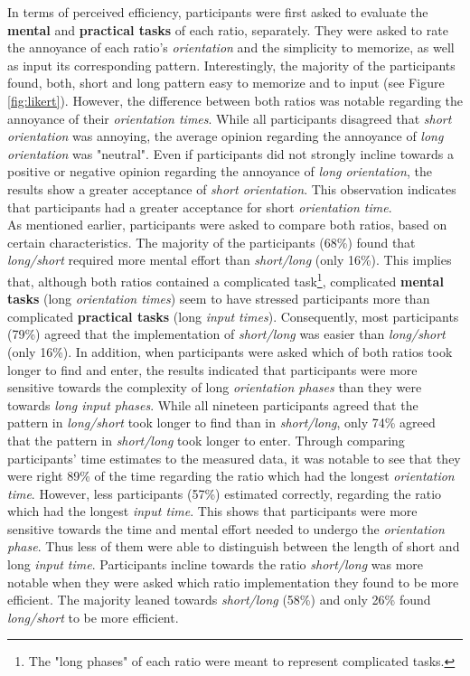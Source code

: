 In terms of perceived efficiency, participants were first asked to evaluate the \textbf{mental} and \textbf{practical tasks} of each ratio, separately. They were asked to rate the annoyance of each ratio's \textit{orientation} and the simplicity to memorize, as well as input its corresponding pattern. Interestingly, the majority of the participants found, both, short and long pattern easy to memorize and to input (see Figure \ref{fig:likert}). However, the difference between both ratios was notable regarding the annoyance of their \textit{orientation times}. While all participants disagreed that \textit{short orientation} was annoying, the average opinion regarding the annoyance of \textit{long orientation} was "neutral". Even if participants did not strongly incline towards a positive or negative opinion regarding the annoyance of \textit{long orientation}, the results show a greater acceptance of \textit{short orientation}. This observation indicates that participants had a greater acceptance for short \textit{orientation time}.\\

As mentioned earlier, participants were asked to compare both ratios, based on certain characteristics. The majority of the participants (68\%) found that \textit{long/short} required more mental effort than \textit{short/long} (only 16\%). This implies that, although both ratios contained a complicated task\footnote{The "long phases" of each ratio were meant to represent complicated tasks.}, complicated \textbf{mental tasks} (long \textit{orientation times}) seem to have stressed participants more than complicated \textbf{practical tasks} (long \textit{input times}). Consequently, most participants (79\%) agreed that the implementation of \textit{short/long} was easier than \textit{long/short} (only 16\%). In addition, when participants were asked which of both ratios took longer to find and enter, the results indicated that participants were more sensitive towards the complexity of long \textit{orientation phases} than they were towards \textit{long input phases}. While all nineteen participants agreed that the pattern in \textit{long/short} took longer to find than in \textit{short/long}, only 74\% agreed that the pattern in \textit{short/long} took longer to enter. Through comparing participants' time estimates to the measured data, it was notable to see that they were right 89\% of the time regarding the ratio which had the longest \textit{orientation time}. However, less participants (57\%) estimated correctly, regarding the ratio which had the longest \textit{input time}. This shows that participants were more sensitive towards the time and mental effort needed to undergo the \textit{orientation phase}. Thus less of them were able to distinguish between the length of short and long \textit{input time}. Participants incline towards the ratio \textit{short/long} was more notable when they were asked which ratio implementation they found to be more efficient. The majority leaned towards \textit{short/long} (58\%) and only 26\% found \textit{long/short} to be more efficient.\\

